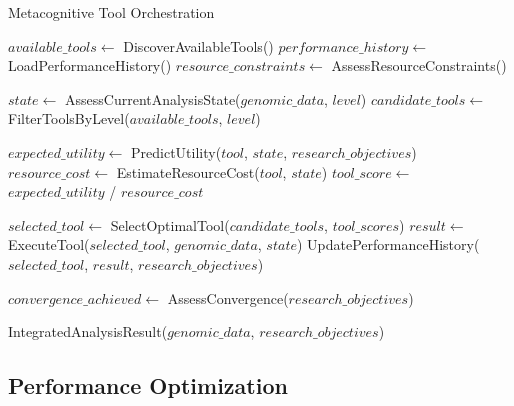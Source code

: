 \documentclass[12pt,a4paper]{article}
\begin{document}
\begin{algorithm}
\caption{Metacognitive Tool Orchestration}
\begin{algorithmic}
    \State $available\_tools \gets$ DiscoverAvailableTools()
    \State $performance\_history \gets$ LoadPerformanceHistory()
    \State $resource\_constraints \gets$ AssessResourceConstraints()
    
            \State $state \gets$ AssessCurrentAnalysisState($genomic\_data$, $level$)
            \State $candidate\_tools \gets$ FilterToolsByLevel($available\_tools$, $level$)
            
                \State $expected\_utility \gets$ PredictUtility($tool$, $state$, $research\_objectives$)
                \State $resource\_cost \gets$ EstimateResourceCost($tool$, $state$)
                \State $tool\_score \gets$ $expected\_utility$ / $resource\_cost$
            \EndFor
            
            \State $selected\_tool \gets$ SelectOptimalTool($candidate\_tools$, $tool\_scores$)
            \State $result \gets$ ExecuteTool($selected\_tool$, $genomic\_data$, $state$)
            \State UpdatePerformanceHistory($selected\_tool$, $result$, $research\_objectives$)
        \EndFor
        
        \State $convergence\_achieved \gets$ AssessConvergence($research\_objectives$)
    \EndWhile
    
    \State \Return IntegratedAnalysisResult($genomic\_data$, $research\_objectives$)
\EndProcedure
\end{algorithmic}
\end{algorithm}

\subsection{Performance Optimization}
\end{document}
